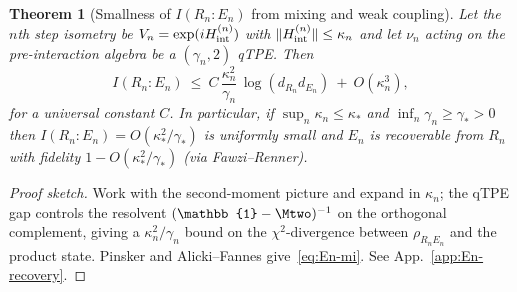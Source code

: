 \documentclass[11pt,a4paper]{article}
\theoremstyle{plain}
\newtheorem{theorem}{Theorem}
\theoremstyle{definition}
\theoremstyle{remark}
\begin{document}

\begin{theorem}[Smallness of $I(R_n{:}E_n)$ from mixing and weak coupling]\label{thm:En-mi}
Let the $n$th step isometry be $V_n=\exp(i H_{\rm int}^{(n)})$ with $\|H_{\rm int}^{(n)}\| \le \kappa_n$ and let $\nu_n$ acting on the pre-interaction algebra be a $(\gamma_n,2)$ qTPE. Then
\begin{equation}\label{eq:En-mi}
I(R_n{:}E_n)\ \le\ C\, \frac{\kappa_n^2}{\gamma_n}\,\log(d_{R_n}d_{E_n})\ +\ O(\kappa_n^3),
\end{equation}
for a universal constant $C$. In particular, if $\sup_n\kappa_n\le \kappa_*$ and $\inf_n\gamma_n\ge \gamma_*>0$ then $I(R_n{:}E_n)=O(\kappa_*^2/\gamma_*)$ is uniformly small and $E_n$ is recoverable from $R_n$ with fidelity $1-O(\kappa_*^2/\gamma_*)$ (via Fawzi--Renner).
\end{theorem}
\begin{proof}[Proof sketch]
Work with the second-moment picture and expand in $\kappa_n$; the qTPE gap controls the resolvent $(\mathbb{1}-\Mtwo)^{-1}$ on the orthogonal complement, giving a $\kappa_n^2/\gamma_n$ bound on the $\chi^2$-divergence between $\rho_{R_nE_n}$ and the product state. Pinsker and Alicki--Fannes give~\eqref{eq:En-mi}. See App.~\ref{app:En-recovery}.
\end{proof}
\end{document}
